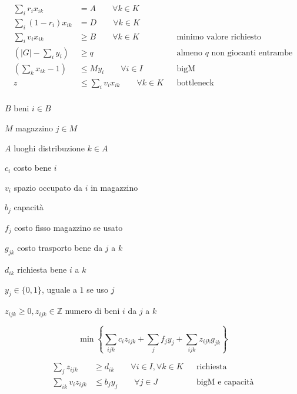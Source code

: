 \begin{align*}
	\sum _{i} r_{i} x_{ik} &=A\qquad\forall k\in K && \text{} \\
	\sum _{i}( 1-r_{i}) x_{ik} &=D\qquad\forall k\in K && \text{} \\
	\sum _{i} v_{i} x_{ik} &\geq B\qquad\forall k\in K && \text{minimo valore richiesto} \\
	\left( |G|-\sum _{i} y_{i}\right) &\geq q && \text{almeno $q$ non giocanti entrambe} \\
	\left(\sum _{k} x_{ik} -1\right) &\leq My_{i} \qquad\forall i\in I && \text{bigM} \\
	z&\leq \sum _{i} v_{i} x_{ik} \qquad\forall k\in K && \text{bottleneck} \\
\end{align*}

\Es

\Par

$B$ beni $i\in B$

$M$ magazzino $j\in M$

$A$ luoghi distribuzione $k\in A$

$c_{i}$ costo bene $i$

$v_{i}$ spazio occupato da $i$ in magazzino

$b_{j}$ capacità

$f_{j}$ costo fisso magazzino se usato

$g_{jk}$ costo trasporto bene da $j$ a $k$

$d_{ik}$ richiesta bene $i$ a $k$

\Var

$y_{j} \in \{0,1\}$, uguale a $1$ se uso $j$

$z_{ijk} \geq 0,z_{ijk} \in \mathbb{Z}$ numero di beni $i$ da $j$ a $k$

\Fob

\begin{equation*}
	\min\left\{\sum _{ijk} c_{i} z_{ijk} +\sum _{j} f_{j} y_{j} +\sum _{ijk} z_{ijk} g_{jk}\right\}
\end{equation*}

\Vin

\begin{align*}
	\sum _{j} z_{ijk} &\geq d_{ik} \qquad\forall i\in I,\forall k\in K && \text{richiesta} \\
	\sum _{ik} v_{i} z_{ijk} &\leq b_{j} y_{j} \qquad\forall j\in J && \text{bigM e capacità} \\
\end{align*}

\Es

